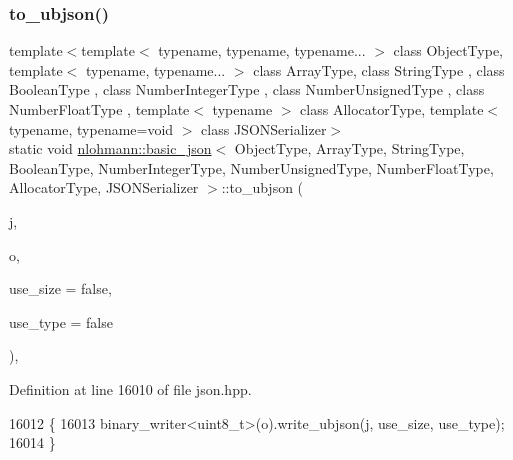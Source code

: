\subsubsection{\texorpdfstring{to\+\_\+ubjson()}{to\_ubjson()}\hspace{0.1cm}{\footnotesize\ttfamily [2/3]}}
{\footnotesize\ttfamily template$<$template$<$ typename, typename, typename... $>$ class Object\+Type, template$<$ typename, typename... $>$ class Array\+Type, class String\+Type , class Boolean\+Type , class Number\+Integer\+Type , class Number\+Unsigned\+Type , class Number\+Float\+Type , template$<$ typename $>$ class Allocator\+Type, template$<$ typename, typename=void $>$ class J\+S\+O\+N\+Serializer$>$ \\
static void \hyperlink{classnlohmann_1_1basic__json}{nlohmann\+::basic\+\_\+json}$<$ Object\+Type, Array\+Type, String\+Type, Boolean\+Type, Number\+Integer\+Type, Number\+Unsigned\+Type, Number\+Float\+Type, Allocator\+Type, J\+S\+O\+N\+Serializer $>$\+::to\+\_\+ubjson (\begin{DoxyParamCaption}\item[{const \hyperlink{classnlohmann_1_1basic__json}{basic\+\_\+json}$<$ Object\+Type, Array\+Type, String\+Type, Boolean\+Type, Number\+Integer\+Type, Number\+Unsigned\+Type, Number\+Float\+Type, Allocator\+Type, J\+S\+O\+N\+Serializer $>$ \&}]{j,  }\item[{\hyperlink{classnlohmann_1_1detail_1_1output__adapter}{detail\+::output\+\_\+adapter}$<$ uint8\+\_\+t $>$}]{o,  }\item[{const bool}]{use\+\_\+size = {\ttfamily false},  }\item[{const bool}]{use\+\_\+type = {\ttfamily false} }\end{DoxyParamCaption})\hspace{0.3cm}{\ttfamily [inline]}, {\ttfamily [static]}}



Definition at line 16010 of file json.\+hpp.


\begin{DoxyCode}
16012     \{
16013         binary\_writer<uint8\_t>(o).write\_ubjson(j, use\_size, use\_type);
16014     \}
\end{DoxyCode}
\mbox{\label{classnlohmann_1_1basic__json_af66db22ad819346a688042a9da68ee5f}} 
